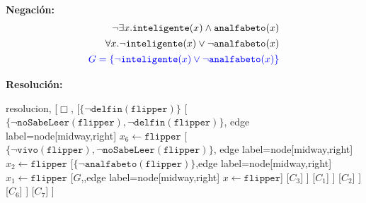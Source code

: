 \documentclass[10pt,a4paper]{article}
\begin{document}
\textbf{Negación:}
\begin{align*}
\lnot\exists x.\texttt{inteligente}(x)\land\texttt{analfabeto}(x)\\[1pt]
\forall x.\lnot\texttt{inteligente}(x)\lor\lnot\texttt{analfabeto}(x)\\[1pt]
{\color{blue}G = \{\lnot\texttt{inteligente}(x)\lor\lnot\texttt{analfabeto}(x)\}}\\[1pt]
\end{align*}

\textbf{Resolución:}
\begin{center}
	\begin{forest} resolucion,
[$\Box$,
    [$\{ \lnot \texttt{delfin}(\texttt{flipper})\}$
        [$\{\lnot \texttt{noSabeLeer}(\texttt{flipper})\comma \lnot \texttt{delfin}(\texttt{flipper})\}$, edge label={node[midway,right] {$x_6\leftarrow \texttt{flipper}$}}
            [$\{\lnot \texttt{vivo}(\texttt{flipper})\comma \lnot \texttt{noSabeLeer}(\texttt{flipper})\}$, edge label={node[midway,right] {$x_2\leftarrow \texttt{flipper}$}}
                [$\{\lnot \texttt{analfabeto}(\texttt{flipper})\}$,edge label={node[midway,right] {$x_1\leftarrow \texttt{flipper}$}}
                    [$G$,,edge label={node[midway,right] {$x\leftarrow \texttt{flipper}$}}]
                    [$C_3$]
                ]
                [$C_1$]
            ]
            [$C_2$]
        ]
        [$C_6$]
    ]
    [$C_7$]
]
	\end{forest}
\end{center}

\end{document}

